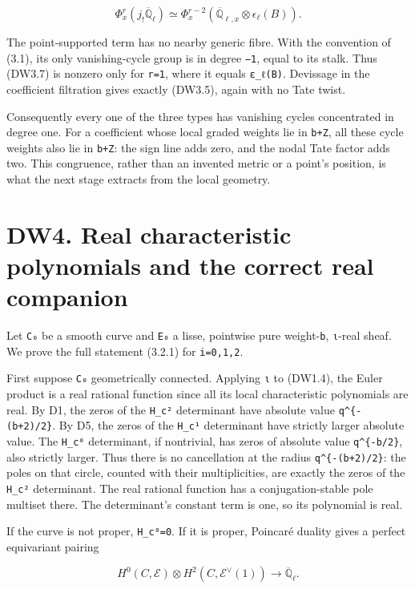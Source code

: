 \documentclass[
]{report}
\begin{document}
\[
\Phi_x^r(j_!\overline{\mathbb Q}_\ell)
\simeq\Phi_x^{r-2}
(\overline{\mathbb Q}_{\ell,x}\otimes\epsilon_\ell(B)).
\tag{DW3.7}
\]

The point-supported term has no nearby generic fibre. With the
convention of (3.1), its only vanishing-cycle group is in degree
\texttt{−1}, equal to its stalk. Thus (DW3.7) is nonzero only for
\texttt{r=1}, where it equals \texttt{ε\_ℓ(B)}. Devissage in the
coefficient filtration gives exactly (DW3.5), again with no Tate twist.

Consequently every one of the three types has vanishing cycles
concentrated in degree one. For a coefficient whose local graded weights
lie in \texttt{b+Z}, all these cycle weights also lie in \texttt{b+Z}:
the sign line adds zero, and the nodal Tate factor adds two. This
congruence, rather than an invented metric or a point's position, is
what the next stage extracts from the local geometry.

\section{DW4. Real characteristic polynomials and the correct real
companion}\label{dw4.-real-characteristic-polynomials-and-the-correct-real-companion}

Let \texttt{C₀} be a smooth curve and \texttt{E₀} a lisse, pointwise
pure weight-\texttt{b}, \texttt{ι}-real sheaf. We prove the full
statement (3.2.1) for \texttt{i=0,1,2}.

First suppose \texttt{C₀} geometrically connected. Applying \texttt{ι}
to (DW1.4), the Euler product is a real rational function since all its
local characteristic polynomials are real. By D1, the zeros of the
\texttt{H\_c²} determinant have absolute value
\texttt{q\^{}\{-(b+2)/2\}}. By D5, the zeros of the \texttt{H\_c¹}
determinant have strictly larger absolute value. The \texttt{H\_c⁰}
determinant, if nontrivial, has zeros of absolute value
\texttt{q\^{}\{-b/2\}}, also strictly larger. Thus there is no
cancellation at the radius \texttt{q\^{}\{-(b+2)/2\}}: the poles on that
circle, counted with their multiplicities, are exactly the zeros of the
\texttt{H\_c²} determinant. The real rational function has a
conjugation-stable pole multiset there. The determinant's constant term
is one, so its polynomial is real.

If the curve is not proper, \texttt{H\_c⁰=0}. If it is proper, Poincaré
duality gives a perfect equivariant pairing

\[
H^0(C,\mathcal E)\otimes H^2(C,\mathcal E^\vee(1))
\longrightarrow\overline{\mathbb Q}_\ell.
\tag{DW4.1}
\]
\end{document}
